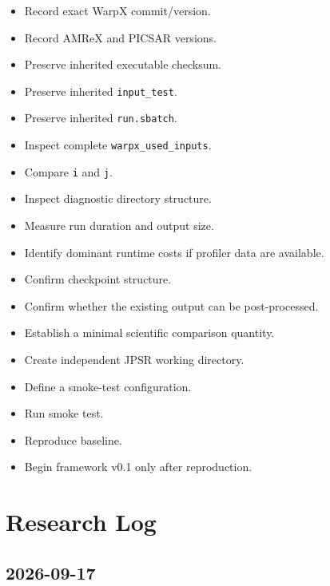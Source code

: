 \documentclass[11pt,a4paper]{article}
\begin{document}
\begin{itemize}[label=$\square$]
    \item Record exact WarpX commit/version.
    \item Record AMReX and PICSAR versions.
    \item Preserve inherited executable checksum.
    \item Preserve inherited \texttt{input\_test}.
    \item Preserve inherited \texttt{run.sbatch}.
    \item Inspect complete \texttt{warpx\_used\_inputs}.
    \item Compare \texttt{i} and \texttt{j}.
    \item Inspect diagnostic directory structure.
    \item Measure run duration and output size.
    \item Identify dominant runtime costs if profiler data are available.
    \item Confirm checkpoint structure.
    \item Confirm whether the existing output can be post-processed.
    \item Establish a minimal scientific comparison quantity.
    \item Create independent JPSR working directory.
    \item Define a smoke-test configuration.
    \item Run smoke test.
    \item Reproduce baseline.
    \item Begin framework v0.1 only after reproduction.
\end{itemize}

\section{Research Log}

\subsection*{2026-09-17}
\end{document}
